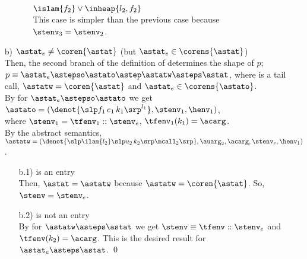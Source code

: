 \documentclass{LMCS}
\theoremstyle{definition} \newtheorem{property}[thm]{Property}
\begin{document}
\begin{enumerate}[$\bullet$]
\begin{enumerate}[$\bullet$]
\begin{enumerate}[$\bullet$]
              $\islam{f_2} \lor \inheap{l_2, f_2}$ \\
              This case is simpler than the previous case because
              $\stenv_3 = \stenv_2$.
            \end{enumerate}
  \end{enumerate}
\item[b)]
  $\entry \neq \coren{\astat}$ (but $\entry \in \corens{\astat}$) \\
  Then, the second branch of the definition of \dcorens{} determines the
  shape of $p$; \\
  $p \equiv \entry \astepso \astato \astep \astatw \asteps \astat$,
  where \astato{} is a tail call, $\astatw = \coren{\astat}$
  and $\entry \in \corens{\astato}$. \\
  By \ih{} for $\entry \astepso \astato$ 
  we get $\astato = (\denot{\slp f_1 \, e_1 \, k_1\srp^{l_1}}, 
  \stenv_1, \henv_1)$, \\
  where $\stenv_1 = \tfenv_1::\stenv_e$, 
  $\tfenv_1(k_1) = \acarg$. \\
  By the abstract semantics, 
  $\astatw = (\denot{\slp \ilam{l_2}\slp u_2 \, k_2\srp \mcall_2\srp}, 
  \auarg_2, \acarg, \stenv_e, \henv_1)$.
  \begin{enumerate}[$\bullet$] 
  \item[b.1)]
    \astat{} is an entry \\
    Then, $\astat = \astatw$ because $\astatw = \coren{\astat}$.
    So, $\stenv = \stenv_e$.
  \item[b.2)]
    \astat{} is not an entry \\
    By \ih{} for $\astatw \asteps \astat$ we get
    $\stenv \equiv \tfenv::\stenv_e$ and 
    $\tfenv(k_2) = \acarg$.
    This is the desired result for $\entry \asteps \astat$.
    \qed
  \end{enumerate}
\end{enumerate}
\end{document}
